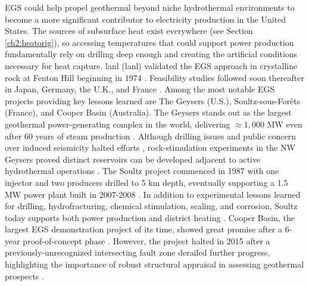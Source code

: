 EGS could help propel geothermal beyond niche hydrothermal environments to become a more significant contributor to electricity production in the United States. The sources of subsurface heat exist everywhere (see Section \ref{ch2:heatorig}), so accessing temperatures that could support power production fundamentally rely on drilling deep enough and creating the artificial conditions necessary for heat capture. \acrlong{lanl} (\acrshort{lanl}) validated the EGS approach in crystalline rock at Fenton Hill beginning in 1974 \citep{tester_future_2006}. Feasibility studies followed soon thereafter in Japan, Germany, the U.K., and France \citep{breede_systematic_2013}. Among the most notable EGS projects providing key lessons learned are The Geysers (U.S.), Soultz-sous-Forêts (France), and Cooper Basin (Australia). The Geysers stands out as the largest geothermal power-generating complex in the world, delivering $\approx1,000$ MW even after 60 years of steam production \citep{jelacic_evaluation_2008,williams_assessment_2008}. Although drilling issues and public concern over induced seismicity halted efforts \citep{larson_altarock_2009}, rock-stimulation experiments in the NW Geysers proved distinct reservoirs can be developed adjacent to active hydrothermal operations \citep{pan_establishment_2019}. The Soultz project commenced in 1987 with one injector and two producers drilled to 5 km depth, eventually supporting a 1.5 MW power plant built in 2007-2008 \citep[p.\ 463]{dipippo_geothermal_2012}. In addition to experimental lessons learned for drilling, hydrofracturing, chemical stimulation, scaling, and corrosion, Soultz today supports both power production and district heating \citep{durst_overview_2013}. Cooper Basin, the largest EGS demonstration project of its time, showed great promise after a 6-year proof-of-concept phase \citep{stephens_assessing_2010}. However, the project halted in 2015 after a previously-unrecognized intersecting fault zone derailed further progress, highlighting the importance of robust structural appraisal in assessing geothermal prospects \citep{holl_what_2015}. 

